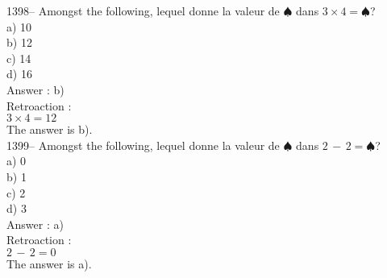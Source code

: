 ﻿\documentclass[letterpaper, 12pt]{article}
\begin{document}
1398-- Amongst the following, lequel donne la valeur de
$\spadesuit$ dans $3\times4=\spadesuit$?\\
a) 10\\
b) 12\\
c) 14\\
d) 16\\

Answer : b)\\

Retroaction : \\
$3\times4=12$\\
The answer is b).\\

1399-- Amongst the following, lequel donne la valeur de
$\spadesuit$ dans $2\,-\,2=\spadesuit$?\\
a) 0\\
b) 1\\
c) 2\\
d) 3\\

Answer : a)\\

Retroaction : \\
$2\,-\,2=0$\\
The answer is a).\\
\end{document}

